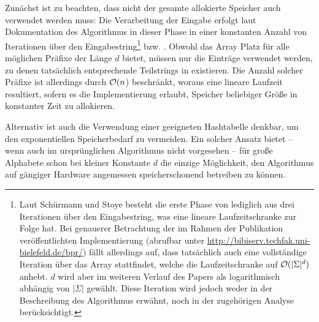 Zunächst ist zu beachten, dass nicht der gesamte allokierte Speicher auch verwendet werden muss: Die Verarbeitung der Eingabe erfolgt laut Dokumentation des Algorithmus in dieser Phase in einer konstanten Anzahl von Iterationen über den Eingabestring\footnote{Laut Schürmann und Stoye \cite[Kapitel~3.3]{saca:2} besteht die erste Phase von \bpr lediglich aus drei Iterationen über den Eingabestring, was eine lineare Laufzeitschranke zur Folge hat. Bei genauerer Betrachtung der im Rahmen der Publikation veröffentlichten Implementierung (abrufbar unter \url{http://bibiserv.techfak.uni-bielefeld.de/bpr/}) fällt allerdings auf, dass tatsächlich auch eine vollständige Iteration über das Array \bkt stattfindet, welche die Laufzeitschranke auf \(\mathcal{O}(|\Sigma|^d)\) anhebt. \(d\) wird aber im weiteren Verlauf des Papers als logarithmisch abhängig von \(|\Sigma|\) gewählt. Diese Iteration wird jedoch weder in der Beschreibung des Algorithmus erwähnt, noch in der zugehörigen Analyse berücksichtigt.}  bzw. . Obwohl das Array \bkt Platz für alle möglichen Präfixe der Länge \(d\) bietet, müssen nur die Einträge verwendet werden, zu denen tatsächlich entsprechende Teilstrings in  existieren. Die Anzahl solcher Präfixe ist allerdings durch \(\mathcal{O}(n\)) beschränkt, woraus eine lineare Laufzeit resultiert, sofern es die Implementierung erlaubt, Speicher beliebiger Größe in konstanter Zeit zu allokieren.\par
Alternativ ist auch die Verwendung einer geeigneten Hashtabelle denkbar, um den exponentiellen Speicherbedarf zu vermeiden. Ein solcher Ansatz bietet -- wenn auch im ursprünglichen Algorithmus nicht vorgesehen -- für große Alphabete schon bei kleiner Konstante \(d\) die einzige Möglichkeit, den Algorithmus auf gängiger Hardware angemessen speicherschonend betreiben zu können.
